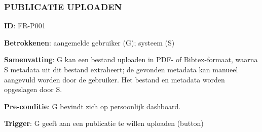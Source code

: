 \subsubsection{PUBLICATIE UPLOADEN}
\vspace{2 mm}

\textbf{ID}: FR-P001
\vspace{2 mm}

\noindent \textbf{Betrokkenen}: aangemelde gebruiker (G); systeem (S) 
\vspace{2 mm}

\noindent \textbf{Samenvatting}: G kan een bestand uploaden in PDF- of Bibtex-formaat, waarna S metadata uit dit bestand extraheert; de gevonden metadata kan manueel aangevuld worden door de gebruiker. Het bestand en metadata worden opgeslagen door S. 
\vspace{2 mm}

\noindent \textbf{Pre-conditie}: G bevindt zich op persoonlijk dashboard.  
\vspace{2 mm}

\noindent \textbf{Trigger}: G geeft aan een publicatie te willen uploaden (button)
\vspace{4 mm}



